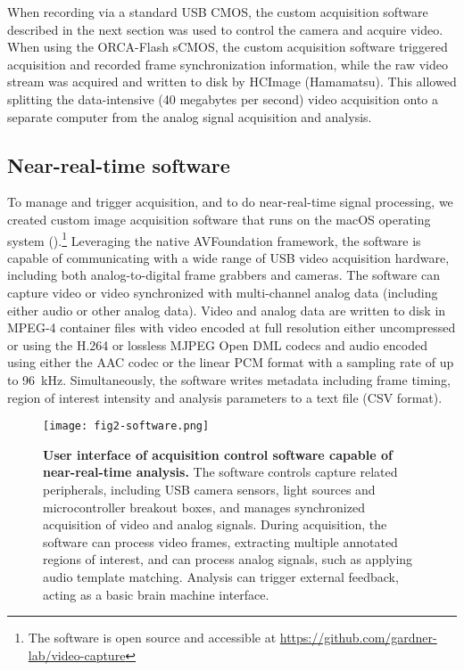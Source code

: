 When recording via a standard USB CMOS, the custom 
acquisition software described in the next section 
was used to control the camera and acquire video. 
When using the ORCA-Flash sCMOS, the custom 
acquisition software triggered acquisition and 
recorded frame synchronization information, while 
the raw video stream was acquired and written to 
disk by HCImage (Hamamatsu). This allowed splitting  
the data-intensive (40 megabytes per second) video 
acquisition onto a separate computer from the 
analog signal acquisition and analysis.

\subsection{Near-real-time software}

To manage and trigger acquisition, and to do near-real-time signal
processing, we created custom image acquisition software that runs
on the macOS operating system ().\footnote{The 
software is open source and accessible at 
\url{https://github.com/gardner-lab/video-capture}}
Leveraging the native AVFoundation framework, the software is 
capable of communicating with a wide range of USB video 
acquisition hardware, including both analog-to-digital frame 
grabbers and cameras. The software can capture video or video 
synchronized with multi-channel analog data (including 
either audio or other analog data). Video and analog data are 
written to disk in MPEG-4 container files with video encoded at 
full resolution either uncompressed or using the H.264 or lossless 
MJPEG Open DML codecs and audio encoded using either the AAC codec 
or the linear PCM format with a sampling rate of up to 
96~\si{\kilo\hertz}. Simultaneously, the software writes metadata 
including frame timing, region of interest intensity and analysis  
parameters to a text file (CSV format).

\begin{figure}
\texttt{[image: fig2-software.png]}
\caption[Software for capture near-real-time analysis]{\textbf{User interface of acquisition
control software capable of near-real-time analysis.} The software 
controls capture related peripherals, including USB camera sensors,
light sources and microcontroller breakout boxes, and manages 
synchronized acquisition of video and analog signals. During 
acquisition, the software can process video frames, extracting 
multiple annotated regions of interest, and can process analog 
signals, such as applying audio template matching. Analysis 
can trigger external feedback, acting as a basic brain machine 
interface.}
\label{fig:software}
\end{figure}

